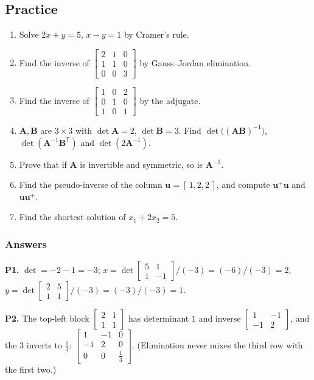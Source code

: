 \documentclass[11pt]{article}
\theoremstyle{plain}
\theoremstyle{definition}
\theoremstyle{remark}
\newcommand{\vc}[1]{\mathbf{#1}}
\newcommand{\mt}[1]{\mathbf{#1}}
\newcommand{\T}{^{\mathsf{T}}}
\begin{document}
\subsection{Practice}
\begin{enumerate}[label=\textbf{P\arabic*.},leftmargin=2.6em,itemsep=5pt]
  \item Solve $2x+y=5$, $x-y=1$ by Cramer's rule.
  \item Find the inverse of $\begin{bmatrix}2&1&0\\1&1&0\\0&0&3\end{bmatrix}$ by
        Gauss--Jordan elimination.
  \item Find the inverse of $\begin{bmatrix}1&0&2\\0&1&0\\1&0&1\end{bmatrix}$ by the
        adjugate.
  \item $\mt{A},\mt{B}$ are $3\times3$ with $\det\mt{A}=2$, $\det\mt{B}=3$. Find
        $\det\bigl((\mt{A}\mt{B})^{-1}\bigr)$, $\det(\mt{A}^{-1}\mt{B}\T)$ and
        $\det(2\mt{A}^{-1})$.
  \item Prove that if $\mt{A}$ is invertible and symmetric, so is $\mt{A}^{-1}$.
  \item Find the pseudo-inverse of the column $\vc{u}=[\,1,2,2\,]$, and compute
        $\vc{u}^{+}\vc{u}$ and $\vc{u}\vc{u}^{+}$.
  \item Find the shortest solution of $x_1+2x_2=5$.
\end{enumerate}

\subsubsection*{Answers}

\noindent\textbf{P1.} $\det=-2-1=-3$;
$x=\det\begin{bmatrix}5&1\\1&-1\end{bmatrix}/(-3)=(-6)/(-3)=2$,
$y=\det\begin{bmatrix}2&5\\1&1\end{bmatrix}/(-3)=(-3)/(-3)=1$.

\smallskip
\noindent\textbf{P2.} The top-left block $\begin{bmatrix}2&1\\1&1\end{bmatrix}$
has determinant $1$ and inverse $\begin{bmatrix}1&-1\\-1&2\end{bmatrix}$, and the
$3$ inverts to $\frac13$:
$\begin{bmatrix}1&-1&0\\-1&2&0\\0&0&\frac13\end{bmatrix}$. (Elimination never mixes
the third row with the first two.)
\end{document}
